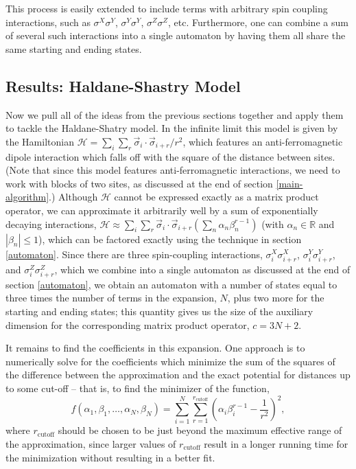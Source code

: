 \documentclass[12pt]{amsbook}
\theoremstyle{plain}
\theoremstyle{definition}
\theoremstyle{remark}
\newcommand{\paren}[1]{\left(#1\right)}
\begin{document}
This process is easily extended to include terms with arbitrary spin coupling interactions, such as $\sigma^X\sigma^Y$, $\sigma^Y\sigma^Y$, $\sigma^Z\sigma^Z$, etc.  Furthermore, one can combine a sum of several such interactions into a single automaton by having them all share the same starting and ending states. 
\subsection{Results:  Haldane-Shastry Model}

Now we pull all of the ideas from the previous sections together and apply them to tackle the Haldane-Shatry model.\cite{PhysRevLett.60.635,PhysRevLett.60.639}  In the infinite limit this model is given by the Hamiltonian $\mathcal{H} = \sum_i \sum_r \vec{\sigma}_i\cdot\vec{\sigma}_{i+r}/r^2$,  which features an anti-ferromagnetic dipole interaction which falls off with the square of the distance between sites.  (Note that since this model features anti-ferromagnetic interactions, we need to work with blocks of two sites, as discussed at the end of section \ref{main-algorithm}.)  Although $\mathcal{H}$ cannot be expressed exactly as a matrix product operator, we can approximate it arbitrarily well by a sum of exponentially decaying interactions, $\mathcal{H}\approx  \sum_i \sum_r \vec{\sigma}_i\cdot\vec{\sigma}_{i+r}\paren{\sum_n \alpha_n \beta_n^{r-1}}$ (with $\alpha_n\in\mathbb{R}$ and $|\beta_n| \le 1$), which can be factored exactly using the technique in section \ref{automaton}.  Since there are three spin-coupling interactions, $\sigma^X_i\sigma^X_{i+r}$, $\sigma^Y_i\sigma^Y_{i+r}$, and $\sigma^Z_i\sigma^Z_{i+r}$, which we combine into a single automaton as discussed at the end of section \ref{automaton}, we obtain an automaton with a number of states equal to three times the number of terms in the expansion, $N$, plus two more for the starting and ending states;  this quantity gives us the size of the auxiliary dimension for the corresponding matrix product operator, $c=3N+2$.

It remains to find the coefficients in this expansion.  One approach is to numerically solve for the coefficients which minimize the sum of the squares of the difference between the approximation and the exact potential for distances up to some cut-off -- that is, to find the minimizer of the function,
$$f(\alpha_1,\beta_1,\dots,\alpha_N,\beta_N) = \sum_{i=1}^N \sum_{r=1}^{r_{\text{cutoff}}} \paren{\alpha_i \beta_i^{r-1} - \frac{1}{r^2}}^2,$$
where $r_{\text{cutoff}}$ should be chosen to be just beyond the maximum effective range of the approximation, since larger values of $r_{\text{cutoff}}$ result in a longer running time for the minimization without resulting in a better fit.
\end{document}
